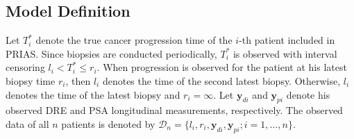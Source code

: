 \subsection{Model Definition}
\label{subsec:model_def}
Let $T_i^*$ denote the true cancer progression time of the ${i\mbox{-th}}$ patient included in PRIAS. Since biopsies are conducted periodically, $T_i^*$ is observed with interval censoring ${l_i < T_i^* \leq r_i}$. When progression is observed for the patient at his latest biopsy time $r_i$, then $l_i$ denotes the time of the second latest biopsy. Otherwise, $l_i$ denotes the time of the latest biopsy and ${r_i=\infty}$. Let $\boldsymbol{y}_{di}$ and $\boldsymbol{y}_{pi}$ denote his observed DRE and PSA longitudinal measurements, respectively. The observed data of all $n$ patients is denoted by ${\mathcal{D}_n = \{l_i, r_i, \boldsymbol{y}_{di}, \boldsymbol{y}_{pi}; i = 1, \ldots, n\}}$.

